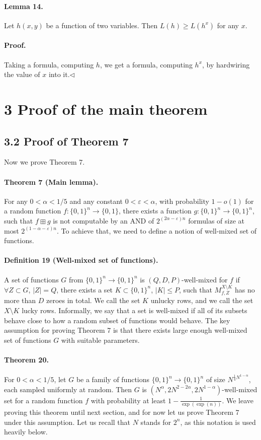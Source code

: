 \paragraph{Lemma 14.} Let $h(x,y)$ be a function of two variables. Then $L(h)\geq L(h^x)$ for any $x$.
\paragraph{Proof.} Taking a formula, computing $h$, we get a formula, computing $h^x$, by hardwiring the value of $x$ into it.\hfill$\triangleleft$
\section*{3 Proof of the main theorem}
\subsection*{3.2 Proof of Theorem 7}
Now we prove Theorem 7.
\paragraph{Theorem 7 (Main lemma).} For any $0<\alpha<1/5$ and any constant $0<\varepsilon<\alpha$, with probability $1-o(1)$ for a random function $f:\{0,1\}^n\to\{0,1\}$, there exists a function $g:\{0,1\}^n\to\{0,1\}^n$, such that $f\boxplus g$ is not computable by an AND of $2^{(2\alpha-\varepsilon)n}$ formulas of size at most $2^{(1-\alpha-\varepsilon)n}$.
To achieve that, we need to define a notion of well-mixed set of functions.
\paragraph{Definition 19 (Well-mixed set of functions).} A set of functions $G$ from $\{0,1\}^n\to\{0,1\}^n$ is $(Q,D,P)$-well-mixed for $f$ if $\forall Z\subset G$, $|Z|=Q$, there exists a set $K\subset\{0,1\}^n$, $|K|\leq P$, such that $M_{f,Z}^{X\setminus K}$ has no more than $D$ zeroes in total. We call the set $K$ unlucky rows, and we call the set $X\setminus K$ lucky rows.
Informally, we say that a set is well-mixed if all of its subsets behave close to how a random subset of functions would behave.
The key assumption for proving Theorem 7 is that there exists large enough well-mixed set of functions $G$ with suitable parameters.
\paragraph{Theorem 20.} For $0<\alpha<1/5$, let $G$ be a family of functions $\{0,1\}^n\to\{0,1\}^n$ of size $N^{\frac14 N^{1-\alpha}}$, each sampled uniformly at random. Then $G$ is $(N^\alpha,2N^{2-2\alpha},2N^{1-\alpha})$-well-mixed set for a random function $f$ with probability at least $1-\frac1{\exp(\exp(n))}$.
We leave proving this theorem until next section, and for now let us prove Theorem 7 under this assumption.
Let us recall that $N$ stands for $2^n$, as this notation is used heavily below.
